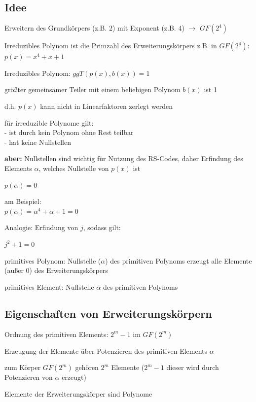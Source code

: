 \subsection{Idee}

Erweitern des Grundkörpers (z.B. $2$) mit Exponent (z.B. $4$) $\rightarrow$
$GF(2^4)$

Irreduzibles Polynom ist die Primzahl des Erweiterungskörpers z.B. in $GF(2^4)$:\\
$\displaystyle{
    p(x) = x^4 + x + 1
}$

Irreduzibles Polynom: $ggT(p(x), b(x)) = 1$

größter gemeinsamer Teiler mit einem beliebigen Polynom $b(x)$ ist 1

d.h. $p(x)$ kann nicht in Linearfaktoren zerlegt werden

für irreduzible Polynome gilt:\\
- ist durch kein Polynom ohne Rest teilbar\\
- hat keine Nullstellen

\textbf{aber:} Nullstellen sind wichtig für Nutzung des RS-Codes, daher \frqq Erfindung\flqq{} des
Elements $\alpha$, welches Nullstelle von $p(x)$ ist

$\displaystyle{
    p(\alpha) = 0
}$

am Beispiel:\\
$\displaystyle{
    p(\alpha) = \alpha^4 + \alpha + 1 = 0
}$

Analogie: \frqq Erfindung\flqq{} von $j$, sodass gilt:

$\displaystyle{
    j^2 + 1 = 0
}$

primitives Polynom: Nullstelle ($\alpha$) des primitiven Polynoms erzeugt alle Elemente (außer 0) des Erweiterungskörpers

primitives Element: Nullstelle $\alpha$ des primitiven Polynoms

\subsection{Eigenschaften von Erweiterungskörpern}

Ordnung des primitiven Elements: $2^m - 1$ im $GF(2^m)$

Erzeugung der Elemente über Potenzieren des primitiven Elements $\alpha$

zum Körper $GF(2^m)$ gehören $2^m$ Elemente ($2^m - 1$ dieser wird durch Potenzieren von $\alpha$ erzeugt)

Elemente der Erweiterungskörper sind Polynome

